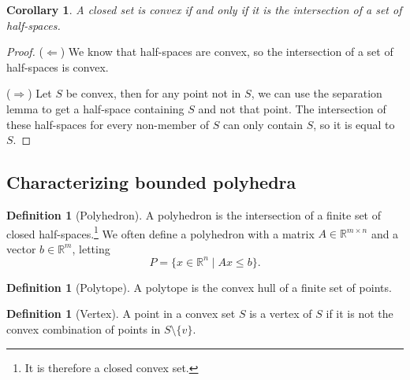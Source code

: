 \documentclass{tufte-handout}
\newtheorem{cor}[thm]{Corollary}
\theoremstyle{definition}
\newtheorem{defn}[thm]{Definition}
\theoremstyle{remark}
\newcommand{\R}{\mathbb{R}}
\begin{document}
\begin{cor}
	A closed set is convex if and only if it is the intersection of a set of half-spaces.
\end{cor}
\begin{proof}
	($\Leftarrow$) We know that half-spaces are convex, so the intersection of a set of half-spaces is convex.
	
	($\Rightarrow$) Let $S$ be convex, then for any point not in $S$, we can use the separation lemma to get a half-space containing $S$ and not that point. The intersection of these half-spaces for every non-member of $S$ can only contain $S$, so it is equal to $S$.
\end{proof}
\subsection{Characterizing bounded polyhedra}
\begin{defn}[Polyhedron]
	A polyhedron is the intersection of a finite set of closed half-spaces.\footnote{It is therefore a closed convex set.} We often define a polyhedron with a matrix $A \in \R^{m\times n}$ and a vector $b\in \R^m$, letting $$P = \{x \in \R^n \mid Ax \leq b\}.$$
\end{defn}
\begin{defn}[Polytope]
	A polytope is the convex hull of a finite set of points.
\end{defn}
\begin{defn}[Vertex]
	A point in a convex set $S$ is a vertex of $S$ if it is not the convex combination of points in $S\setminus\{v\}$.
\end{defn}
\end{document}
